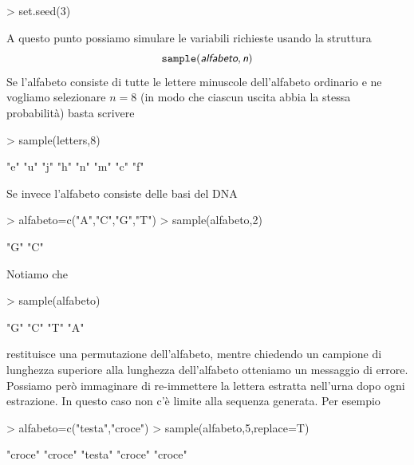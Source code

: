 \documentclass[onecolumn,12pt]{book}
\newcommand{\varia}[1]{\textsl{\textsf{#1}}}
\begin{document}
\begin{Schunk}
\begin{Sinput}
> set.seed(3)
\end{Sinput}
\end{Schunk}
 
A questo punto possiamo simulare le variabili richieste usando la struttura
\begin{equation}\texttt{sample}(\varia{alfabeto},\varia{n})\end{equation}
Se l'alfabeto consiste di tutte le lettere minuscole dell'alfabeto ordinario e ne vogliamo selezionare $n=8$  (in modo che ciascun uscita abbia la stessa probabilit\`a)  basta scrivere
\begin{Schunk}
\begin{Sinput}
> sample(letters,8)
\end{Sinput}
\begin{Soutput}
[1] "e" "u" "j" "h" "n" "m" "c" "f"
\end{Soutput}
\end{Schunk}
Se invece l'alfabeto consiste delle basi del DNA
\begin{Schunk}
\begin{Sinput}
> alfabeto=c("A","C","G","T")
> sample(alfabeto,2)
\end{Sinput}
\begin{Soutput}
[1] "G" "C"
\end{Soutput}
\end{Schunk}
Notiamo che
\begin{Schunk}
\begin{Sinput}
>  sample(alfabeto)
\end{Sinput}
\begin{Soutput}
[1] "G" "C" "T" "A"
\end{Soutput}
\end{Schunk}
restituisce una permutazione dell'alfabeto, mentre chiedendo un campione di lunghezza superiore alla lunghezza dell'alfabeto otteniamo un messaggio di errore. Possiamo per\`o immaginare di re-immettere la lettera estratta nell'urna dopo ogni estrazione. In questo caso non c'\`e limite alla sequenza generata.
Per esempio
\begin{Schunk}
\begin{Sinput}
> alfabeto=c("testa","croce")
> sample(alfabeto,5,replace=T)
\end{Sinput}
\begin{Soutput}
[1] "croce" "croce" "testa" "croce" "croce"
\end{Soutput}
\end{Schunk}
 
\end{document}
